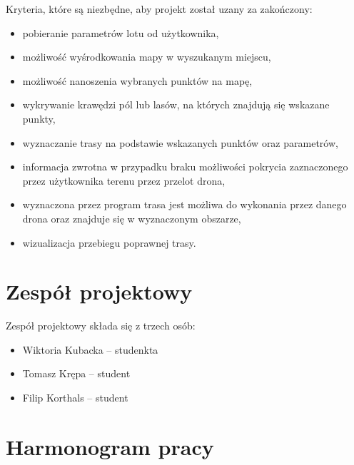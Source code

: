 Kryteria, które są niezbędne, aby projekt został uzany za zakończony:

\begin{itemize}
    \item pobieranie parametrów lotu od użytkownika,
    \item możliwość wyśrodkowania mapy w wyszukanym miejscu,
    \item możliwość nanoszenia wybranych punktów na mapę,
    \item wykrywanie krawędzi pól lub lasów, na których znajdują się wskazane punkty,
    \item wyznaczanie trasy na podstawie wskazanych punktów oraz parametrów,
    \item informacja zwrotna w przypadku braku możliwości pokrycia zaznaczonego przez użytkownika terenu przez przelot drona,
    \item wyznaczona przez program trasa jest możliwa do wykonania przez danego drona oraz znajduje się w wyznaczonym obszarze,
    \item wizualizacja przebiegu poprawnej trasy.
\end{itemize}

\section{Zespół projektowy}

Zespół projektowy składa się z trzech osób:

\begin{itemize}
    \item Wiktoria Kubacka -- studenkta
    \item Tomasz Krępa -- student
    \item Filip Korthals -- student
\end{itemize}

\section{Harmonogram pracy}

